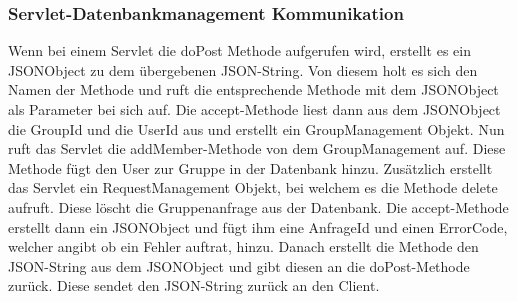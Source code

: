 \subsubsection{Servlet-Datenbankmanagement Kommunikation}
\begin {center}
\end {center}
Wenn bei einem Servlet die doPost Methode aufgerufen wird, erstellt es ein JSONObject zu dem übergebenen JSON-String.
Von diesem holt es sich den Namen der Methode und ruft die entsprechende Methode mit dem JSONObject als Parameter bei sich auf. Die accept-Methode liest dann aus dem JSONObject die GroupId und die UserId aus und erstellt ein GroupManagement Objekt.
Nun ruft das Servlet die addMember-Methode von dem GroupManagement auf. Diese Methode fügt den User zur Gruppe in der Datenbank hinzu. Zusätzlich erstellt das Servlet ein RequestManagement Objekt, bei welchem es die Methode delete aufruft. Diese löscht die Gruppenanfrage aus der Datenbank. Die accept-Methode erstellt dann ein JSONObject und fügt ihm eine AnfrageId und einen ErrorCode, welcher angibt ob ein Fehler auftrat, hinzu. Danach erstellt die Methode den JSON-String aus dem JSONObject und gibt diesen an die doPost-Methode zurück. Diese sendet den JSON-String zurück an den Client.

